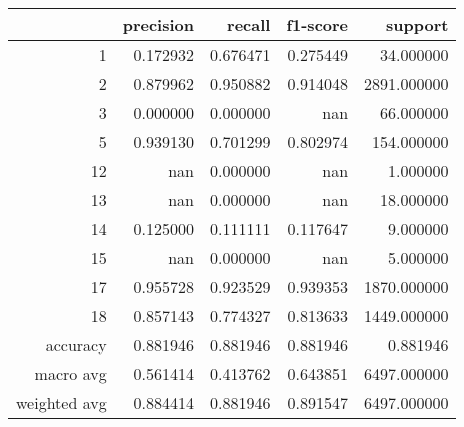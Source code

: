 \begin{tabular}{rrrrr}
\toprule
 & precision & recall & f1-score & support \\
\midrule
1 & 0.172932 & 0.676471 & 0.275449 & 34.000000 \\
2 & 0.879962 & 0.950882 & 0.914048 & 2891.000000 \\
3 & 0.000000 & 0.000000 & nan & 66.000000 \\
5 & 0.939130 & 0.701299 & 0.802974 & 154.000000 \\
12 & nan & 0.000000 & nan & 1.000000 \\
13 & nan & 0.000000 & nan & 18.000000 \\
14 & 0.125000 & 0.111111 & 0.117647 & 9.000000 \\
15 & nan & 0.000000 & nan & 5.000000 \\
17 & 0.955728 & 0.923529 & 0.939353 & 1870.000000 \\
18 & 0.857143 & 0.774327 & 0.813633 & 1449.000000 \\
accuracy & 0.881946 & 0.881946 & 0.881946 & 0.881946 \\
macro avg & 0.561414 & 0.413762 & 0.643851 & 6497.000000 \\
weighted avg & 0.884414 & 0.881946 & 0.891547 & 6497.000000 \\
\bottomrule
\end{tabular}
